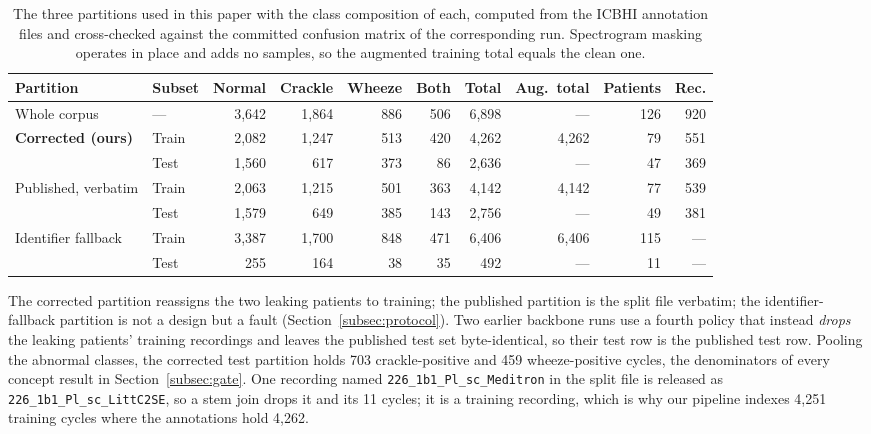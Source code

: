 \documentclass[journal,onecolumn]{IEEEtran}
\newcommand{\best}[1]{\textbf{#1}}
\begin{document}
\begin{table}[!t]
\centering
\caption{The three partitions used in this paper with the class composition of each, computed
from the ICBHI annotation files and cross-checked against the committed confusion matrix of the
corresponding run. Spectrogram masking operates in place and adds no samples, so the augmented
training total equals the clean one.}
\label{tab:partitions}
\footnotesize
\begin{tabular}{llrrrrrrrr}
\toprule
Partition & Subset & Normal & Crackle & Wheeze & Both & Total & Aug.\ total & Patients & Rec. \\
\midrule
Whole corpus & --- & 3{,}642 & 1{,}864 & 886 & 506 & 6{,}898 & --- & 126 & 920 \\
\midrule
\multirow{2}{*}{\best{Corrected (ours)}}
 & Train & 2{,}082 & 1{,}247 & 513 & 420 & 4{,}262 & 4{,}262 & 79 & 551 \\
 & Test  & 1{,}560 & \phantom{0,}617 & 373 & \phantom{0}86 & 2{,}636 & --- & 47 & 369 \\
\midrule
\multirow{2}{*}{Published, verbatim}
 & Train & 2{,}063 & 1{,}215 & 501 & 363 & 4{,}142 & 4{,}142 & 77 & 539 \\
 & Test  & 1{,}579 & \phantom{0,}649 & 385 & 143 & 2{,}756 & --- & 49 & 381 \\
\midrule
\multirow{2}{*}{Identifier fallback}
 & Train & 3{,}387 & 1{,}700 & 848 & 471 & 6{,}406 & 6{,}406 & 115 & --- \\
 & Test  & \phantom{0,}255 & \phantom{0,}164 & \phantom{0}38 & \phantom{0}35 & \phantom{2,}492 & --- & \phantom{0}11 & --- \\
\bottomrule
\end{tabular}

\vspace{2pt}
\footnotesize The corrected partition reassigns the two leaking patients to training; the
published partition is the split file verbatim; the identifier-fallback partition is not a
design but a fault (Section~\ref{subsec:protocol}). Two earlier backbone runs use a fourth
policy that instead \emph{drops} the leaking patients' training recordings and leaves the
published test set byte-identical, so their test row is the published test row. Pooling the
abnormal classes, the corrected test partition holds 703 crackle-positive and 459
wheeze-positive cycles, the denominators of every concept result in
Section~\ref{subsec:gate}. One recording named \texttt{226\_1b1\_Pl\_sc\_Meditron} in the
split file is released as \texttt{226\_1b1\_Pl\_sc\_LittC2SE}, so a stem join drops it and its
11 cycles; it is a training recording, which is why our pipeline indexes 4,251 training cycles
where the annotations hold 4,262.
\end{table}
\end{document}
